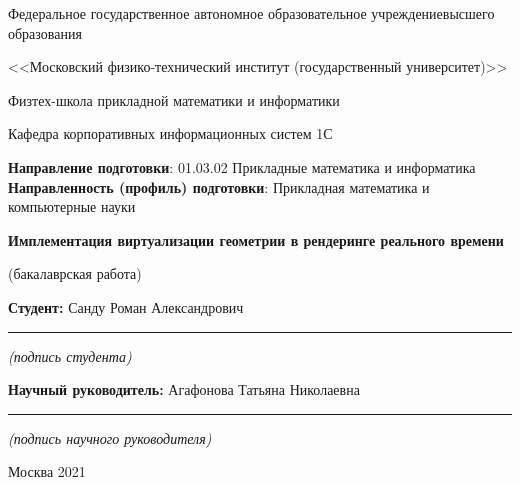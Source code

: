 \documentclass[12pt]{extarticle}
\renewcommand*{\maketitle}{
\begin{titlepage}
  \begin{center}
    Федеральное государственное автономное образовательное учреждение\break высшего образования\par
    <<Московский физико-технический институт (государственный университет)>>\par
    Физтех-школа прикладной математики и информатики\par
    Кафедра корпоративных информационных систем 1С\par
  \end{center}
%
  {\bf Направление подготовки}: 01.03.02 Прикладные математика и информатика\newline
  {\bf Направленность (профиль) подготовки}: Прикладная математика и компьютерные науки\par
%
  {
    \topskip0pt
    \vspace*{\fill}
    \begin{center}
      {\bf\LARGE Имплементация виртуализации геометрии
      \break в рендеринге реального времени}\par
      (бакалаврская работа)
    \end{center}
    \vspace*{\fill}
  }
%
  \hfill
  \begin{minipage}[t]{7cm}
    {\bf Студент: \newline}
    Санду Роман Александрович\newline
    \vspace{-3mm}
    \rule{7cm}{0.15mm}
    \centerline{\small\it (подпись студента)}\newline
    {\bf Научный руководитель: \newline}
    Агафонова Татьяна Николаевна\newline
    \vspace{-3mm}
    \rule{7cm}{0.15mm}
    \centerline{\small\it (подпись научного руководителя)}
  \end{minipage}
%
%
    \vspace*{\fill}
    \begin{center}
      Москва 2021
    \end{center}
\end{titlepage}
}
\begin{document}
\maketitle

\newpage
\setcounter{page}{2}

\vspace*{\fill}
\begin{abstract}
Данная работа посвящена решению задачи адаптивного рендеринга в приложениях реального времени. В качестве цели работы была выбрана имплементация иерархического атласа с виртуальным текстурированием, одного из актуальных подходов к решению этой задачи. В результате работы был выявлен и исправлен ряд недостатков и неточностей этой техники, и предложены улучшения оригинального метода. Была написана эффективная многопоточная реализация приложения конвертации моделей в формат иерархического атласа, а также приложение для рендеринга конвертированных моделей с использованием современного графического API ``Vulkan''.
\end{abstract}
\vspace*{\fill}

\newpage
\tableofcontents
\newpage






\newpage
\printbibliography
\end{document}
